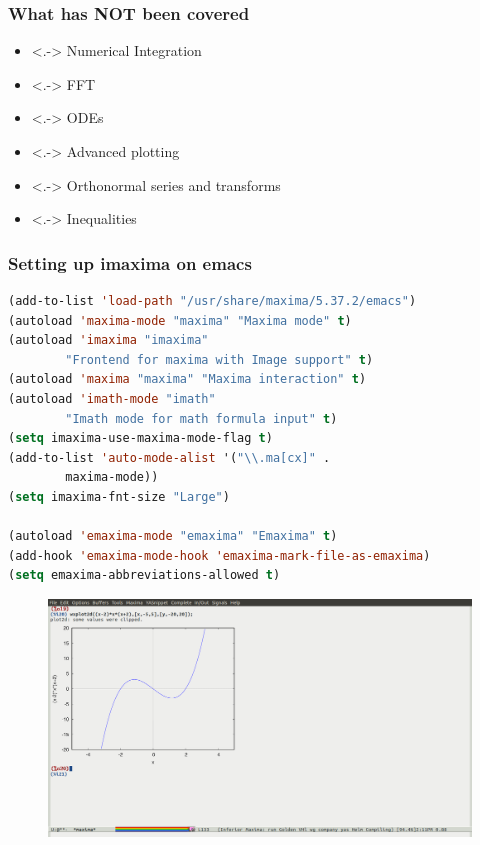 \documentclass[12pt,usenames,pdftex]{beamer}
\begin{document}
\begin{frame}[fragile]
  \frametitle{What has NOT been covered}
  \begin{itemize}
  \item<.-> Numerical Integration
  \item<.-> FFT
  \item<.-> ODEs
  \item<.-> Advanced plotting
  \item<.-> Orthonormal series and transforms
  \item<.-> Inequalities
  \end{itemize}
\end{frame}

\begin{frame}
  \frametitle{Setting up imaxima on emacs}
\begin{lstlisting}[language=lisp,basicstyle=\footnotesize]
(add-to-list 'load-path "/usr/share/maxima/5.37.2/emacs")
(autoload 'maxima-mode "maxima" "Maxima mode" t)
(autoload 'imaxima "imaxima" 
        "Frontend for maxima with Image support" t)
(autoload 'maxima "maxima" "Maxima interaction" t)
(autoload 'imath-mode "imath" 
        "Imath mode for math formula input" t)
(setq imaxima-use-maxima-mode-flag t)
(add-to-list 'auto-mode-alist '("\\.ma[cx]" . 
        maxima-mode))
(setq imaxima-fnt-size "Large")

(autoload 'emaxima-mode "emaxima" "Emaxima" t)
(add-hook 'emaxima-mode-hook 'emaxima-mark-file-as-emaxima)
(setq emaxima-abbreviations-allowed t)
\end{lstlisting}
  \begin{figure}
    \centering
    \includegraphics[width=0.8\linewidth]{Figs/imaxima_demo}
  \end{figure}
\end{frame}
\end{document}
